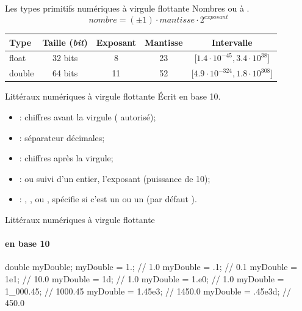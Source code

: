 \begin{hideedit}
\begin{frame}{Les types primitifs numériques à virgule flottante}
  Nombres  ou à .
  \[nombre = (\pm 1) \cdot mantisse \cdot 2^{exposant}\]
  \begin{center}
  \begin{tabular}[t]{|l|c|c|c|c|}
    \hline
    \rowcolor{black!40}
    \textbf{Type}   & \textbf{Taille (\textit{bit})}
    & \textbf{Exposant} & \textbf{Mantisse} & \textbf{Intervalle}\\
    \hline
    float  & 32 bits          & 8    & 23 &
    [\(1.4 \cdot 10^{-45}, 3.4 \cdot 10^{38}\)]\\
    \hline
    double  & 64 bits          & 11  & 52 &
    [\(4.9 \cdot 10^{-324}, 1.8 \cdot 10^{308}\)]\\
    \hline
  \end{tabular}
  \end{center}
\end{frame}

\begin{frame}{Littéraux numériques à virgule flottante}
  Écrit en base 10.
  \begin{center}
    \bf {}
  \end{center}
  \begin{itemize}
    \item {} : chiffres avant la virgule (\pc{\_} autorisé);
    \item {} : séparateur décimales;
    \item {} : chiffres après la virgule;
    \item {} :  ou  suivi d'un entier,
      l'exposant (puissance de 10);
    \item {} : , ,  ou , spécifie si c'est un
       ou un  (par défaut ).
  \end{itemize}
\end{frame}

\begin{frame}[fragile]{Littéraux numériques à virgule flottante}
  \framesubtitle{en base 10}
\begin{java}
double myDouble;
myDouble = 1.;       // 1.0
myDouble = .1;       // 0.1
myDouble = 1e1;      // 10.0
myDouble = 1d;       // 1.0
myDouble = 1.e0;     // 1.0
myDouble = 1_000.45; // 1000.45
myDouble = 1.45e3;   // 1450.0
myDouble = .45e3d;   // 450.0


\end{java}
\end{frame}
\end{hideedit}
